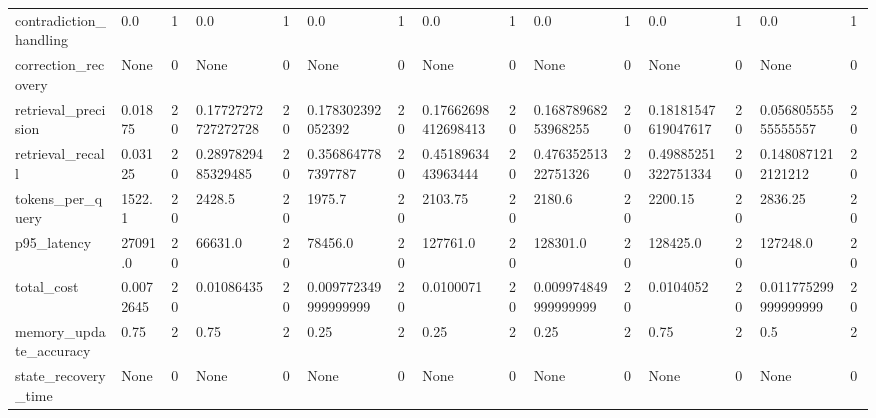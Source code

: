 \begin{tabular}{lllllllllllllll}
contradiction\_handling & 0.0 & 1 & 0.0 & 1 & 0.0 & 1 & 0.0 & 1 & 0.0 & 1 & 0.0 & 1 & 0.0 & 1 \\
correction\_recovery & None & 0 & None & 0 & None & 0 & None & 0 & None & 0 & None & 0 & None & 0 \\
retrieval\_precision & 0.01875 & 20 & 0.17727272727272728 & 20 & 0.178302392052392 & 20 & 0.17662698412698413 & 20 & 0.16878968253968255 & 20 & 0.18181547619047617 & 20 & 0.05680555555555557 & 20 \\
retrieval\_recall & 0.03125 & 20 & 0.2897829485329485 & 20 & 0.3568647787397787 & 20 & 0.4518963443963444 & 20 & 0.47635251322751326 & 20 & 0.49885251322751334 & 20 & 0.1480871212121212 & 20 \\
tokens\_per\_query & 1522.1 & 20 & 2428.5 & 20 & 1975.7 & 20 & 2103.75 & 20 & 2180.6 & 20 & 2200.15 & 20 & 2836.25 & 20 \\
p95\_latency & 27091.0 & 20 & 66631.0 & 20 & 78456.0 & 20 & 127761.0 & 20 & 128301.0 & 20 & 128425.0 & 20 & 127248.0 & 20 \\
total\_cost & 0.0072645 & 20 & 0.01086435 & 20 & 0.009772349999999999 & 20 & 0.0100071 & 20 & 0.009974849999999999 & 20 & 0.0104052 & 20 & 0.011775299999999999 & 20 \\
memory\_update\_accuracy & 0.75 & 2 & 0.75 & 2 & 0.25 & 2 & 0.25 & 2 & 0.25 & 2 & 0.75 & 2 & 0.5 & 2 \\
state\_recovery\_time & None & 0 & None & 0 & None & 0 & None & 0 & None & 0 & None & 0 & None & 0 \\
\end{tabular}
